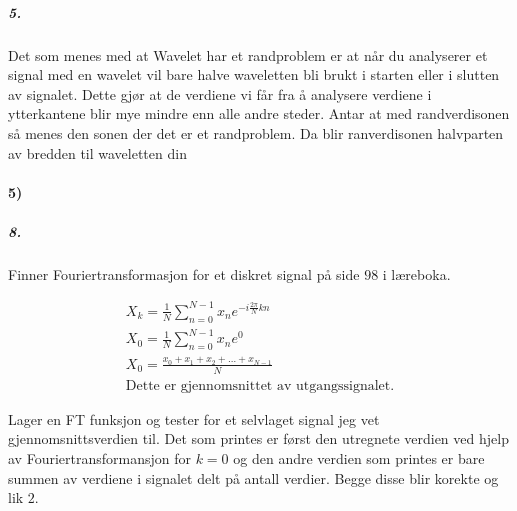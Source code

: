\documentclass[11pt, A4paper,norsk]{article}
\begin{document}
			\subparagraph{5.}
				\begin{flushleft}
Det som menes med at Wavelet har et randproblem er at når du analyserer et signal med en wavelet vil bare halve waveletten bli brukt i starten eller i slutten av signalet. Dette gjør at de verdiene vi får fra å analysere verdiene i ytterkantene blir mye mindre enn alle andre steder. Antar at med randverdisonen så menes den sonen der det er et randproblem. Da blir ranverdisonen halvparten av bredden til waveletten din
				\end{flushleft}









		\paragraph{5)}
			\subparagraph{8.}
				\begin{flushleft}
Finner Fouriertransformasjon for et diskret signal på side $98$ i læreboka.
				\end{flushleft}
				\begin{gather*}
X_k = \frac{1}{N} \sum_{n = 0}^{N - 1} x_n e^{-i\frac{2 \pi}{N} kn} \\
X_0 = \frac{1}{N} \sum_{n = 0}^{N - 1} x_n e^{0} \\
X_0 = \frac{x_0 + x_1 + x_2 + \dots + x_{N - 1}}{N} \\
\text{Dette er gjennomsnittet av utgangssignalet.}
				\end{gather*}
				\begin{flushleft}
Lager en FT funksjon og tester for et selvlaget signal jeg vet gjennomsnittsverdien til. Det som printes er først den utregnete verdien ved hjelp av Fouriertransformansjon for $k = 0$ og den andre verdien som printes er bare summen av verdiene i signalet delt på antall verdier. Begge disse blir korekte og lik $2$.
				\end{flushleft}

\end{document}
